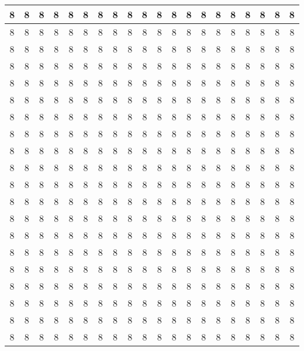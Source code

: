 \documentclass[letterpaper,11pt]{article}
\begin{document}
\begin{landscape}
\begin{center}
\begin{longtable}{|c|c|c|c|c|c|c|c|c|c|c|c|c|c|c|c|c|c|c|c|}
 8 & 8 & 8 & 8 & 8 & 8 & 8 & 8 & 8 & 8 & 8 & 8 & 8 & 8 & 8 & 8 & 8 & 8 & 8 & 8 \\
\hline
 8 & 8 & 8 & 8 & 8 & 8 & 8 & 8 & 8 & 8 & 8 & 8 & 8 & 8 & 8 & 8 & 8 & 8 & 8 & 8 \\
\hline
 8 & 8 & 8 & 8 & 8 & 8 & 8 & 8 & 8 & 8 & 8 & 8 & 8 & 8 & 8 & 8 & 8 & 8 & 8 & 8 \\
\hline
 8 & 8 & 8 & 8 & 8 & 8 & 8 & 8 & 8 & 8 & 8 & 8 & 8 & 8 & 8 & 8 & 8 & 8 & 8 & 8 \\
\hline
 8 & 8 & 8 & 8 & 8 & 8 & 8 & 8 & 8 & 8 & 8 & 8 & 8 & 8 & 8 & 8 & 8 & 8 & 8 & 8 \\
\hline
 8 & 8 & 8 & 8 & 8 & 8 & 8 & 8 & 8 & 8 & 8 & 8 & 8 & 8 & 8 & 8 & 8 & 8 & 8 & 8 \\
\hline
 8 & 8 & 8 & 8 & 8 & 8 & 8 & 8 & 8 & 8 & 8 & 8 & 8 & 8 & 8 & 8 & 8 & 8 & 8 & 8 \\
\hline
 8 & 8 & 8 & 8 & 8 & 8 & 8 & 8 & 8 & 8 & 8 & 8 & 8 & 8 & 8 & 8 & 8 & 8 & 8 & 8 \\
\hline
 8 & 8 & 8 & 8 & 8 & 8 & 8 & 8 & 8 & 8 & 8 & 8 & 8 & 8 & 8 & 8 & 8 & 8 & 8 & 8 \\
\hline
 8 & 8 & 8 & 8 & 8 & 8 & 8 & 8 & 8 & 8 & 8 & 8 & 8 & 8 & 8 & 8 & 8 & 8 & 8 & 8 \\
\hline
 8 & 8 & 8 & 8 & 8 & 8 & 8 & 8 & 8 & 8 & 8 & 8 & 8 & 8 & 8 & 8 & 8 & 8 & 8 & 8 \\
\hline
 8 & 8 & 8 & 8 & 8 & 8 & 8 & 8 & 8 & 8 & 8 & 8 & 8 & 8 & 8 & 8 & 8 & 8 & 8 & 8 \\
\hline
 8 & 8 & 8 & 8 & 8 & 8 & 8 & 8 & 8 & 8 & 8 & 8 & 8 & 8 & 8 & 8 & 8 & 8 & 8 & 8 \\
\hline
 8 & 8 & 8 & 8 & 8 & 8 & 8 & 8 & 8 & 8 & 8 & 8 & 8 & 8 & 8 & 8 & 8 & 8 & 8 & 8 \\
\hline
 8 & 8 & 8 & 8 & 8 & 8 & 8 & 8 & 8 & 8 & 8 & 8 & 8 & 8 & 8 & 8 & 8 & 8 & 8 & 8 \\
\hline
 8 & 8 & 8 & 8 & 8 & 8 & 8 & 8 & 8 & 8 & 8 & 8 & 8 & 8 & 8 & 8 & 8 & 8 & 8 & 8 \\
\hline
 8 & 8 & 8 & 8 & 8 & 8 & 8 & 8 & 8 & 8 & 8 & 8 & 8 & 8 & 8 & 8 & 8 & 8 & 8 & 8 \\
\hline
 8 & 8 & 8 & 8 & 8 & 8 & 8 & 8 & 8 & 8 & 8 & 8 & 8 & 8 & 8 & 8 & 8 & 8 & 8 & 8 \\
\hline
 8 & 8 & 8 & 8 & 8 & 8 & 8 & 8 & 8 & 8 & 8 & 8 & 8 & 8 & 8 & 8 & 8 & 8 & 8 & 8 \\
\hline
 8 & 8 & 8 & 8 & 8 & 8 & 8 & 8 & 8 & 8 & 8 & 8 & 8 & 8 & 8 & 8 & 8 & 8 & 8 & 8 \\

\end{longtable}
\end{center}
\end{landscape}
\end{document}
